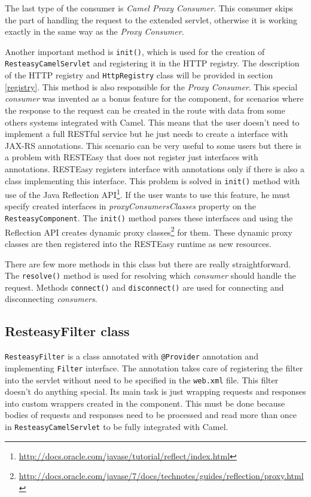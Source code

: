 \documentclass[12pt,final,oneside]{fithesis2}
\begin{document}
The last type of the consumer is \textit{Camel Proxy Consumer}. This consumer skips the part of handling the request to the extended servlet, otherwise it is working exactly in the same way as the \textit{Proxy Consumer}.     

Another important method is \texttt{init()}, which is used for the creation of \texttt{ResteasyCamelServlet} and registering it in the HTTP registry. The description of the HTTP registry and \texttt{HttpRegistry} class will be provided in section \ref{registry}. This method is also responsible for the \textit{Proxy Consumer}. This special \textit{consumer} was invented as a bonus feature for the component, for scenarios where the response to the request can be created in the route with data from some others systems integrated with Camel. This means that the user doesn't need to implement a full RESTful service but he just needs to create a interface with JAX-RS annotations. This scenario can be very useful to some users but there is a problem with RESTEasy that  does not register just interfaces with annotations. RESTEasy registers interface with annotations only if there is also a class implementing this interface. This problem is solved in \texttt{init()} method with use of the Java Reflection API\footnote{\url{http://docs.oracle.com/javase/tutorial/reflect/index.html}}. If the user wants to use this feature, he must specify created interfaces in \textit{proxyConsumersClasses} property on the \texttt{ResteasyComponent}. The \texttt{init()} method parses these interfaces and using the Reflection API creates dynamic proxy classes\footnote{\url{http://docs.oracle.com/javase/7/docs/technotes/guides/reflection/proxy.html}} for them. These dynamic proxy classes are then registered into the RESTEasy runtime as new resources.

There are few more methods in this class but there are really straightforward. The \texttt{resolve()} method is used for resolving which \textit{consumer} should handle the request. Methods \texttt{connect()} and \texttt{disconnect()} are used for connecting and disconnecting \textit{consumers}. 


\subsection*{ResteasyFilter class}
\texttt{ResteasyFilter} is a class annotated with \texttt{@Provider} annotation and implementing \texttt{Filter} interface. The annotation takes care of registering the filter into the servlet without need to be specified in the \texttt{web.xml} file. This filter doesn't do anything special. Its main task is just wrapping requests and responses into custom wrappers created in the component. This must be done because bodies of requests and responses need to be processed and read more than once in \texttt{ResteasyCamelServlet} to be fully integrated with Camel.
\end{document}
